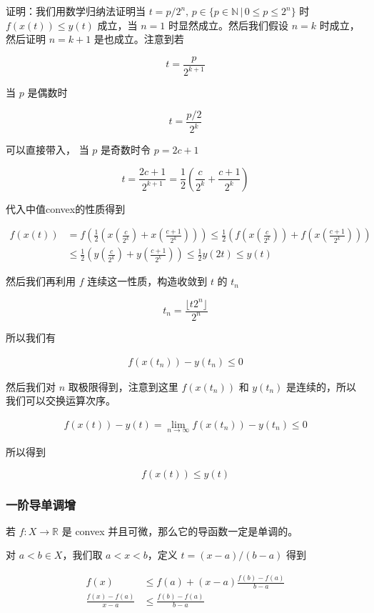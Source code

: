 \documentclass[12pt,a4paper]{ctexart}
\begin{document}
证明：我们用数学归纳法证明当 $t = p/2^n,\, p \in \{ p \in \mathbb{N} \,\vert \, 0 \le p \le 2^n \}$ 时 $f(x(t)) \le y(t)$ 成立，当 $n=1$ 时显然成立。然后我们假设 $n=k$ 时成立，然后证明
$n=k+1$ 是也成立。注意到若

\[
t = \frac{p}{2^{k+1}}
\]

当 $p$ 是偶数时

\[
t = \frac{p/2}{2^k}
\]

可以直接带入，
当 $p$ 是奇数时令 $p = 2c+1$

\[
t = \frac{2c+1}{2^{k+1}} = \frac{1}{2}\left(\frac{c}{2^k} + \frac{c+1}{2^k}\right)
\]


代入中值convex的性质得到

\begin{align*}
f(x(t)) &= f(\frac{1}{2}\left(x(\frac{c}{2^k}) + x(\frac{c+1}{2^k})\right)) \le \frac{1}{2}\left( f(x(\frac{c}{2^k})) + f(x(\frac{c+1}{2^k})) \right) \\
& \le \frac{1}{2}\left( y(\frac{c}{2^k})  + y(\frac{c+1}{2^k})\right) \le \frac{1}{2}y(2t) \le y(t)
\end{align*}

然后我们再利用 $f$ 连续这一性质，构造收敛到 $t$ 的 $t_n$

\[
t_n = \frac{\lfloor t 2^n \rfloor}{2^n}
\]

所以我们有

\begin{align*}
f(x(t_n)) - y(t_n) \le 0
\end{align*}

然后我们对 $n$ 取极限得到，注意到这里 $f(x(t_n))$ 和 $y(t_n)$ 是连续的，所以我们可以交换运算次序。

\begin{align*}
f(x(t)) - y(t)= \lim_{n \to \infty}f(x(t_n)) - y(t_n) \le 0
\end{align*}

所以得到

\[
f(x(t)) \le y(t)
\]

\subsubsection{一阶导单调增}

若 $f: X \to \mathbb{R}$ 是 convex 并且可微，那么它的导函数一定是单调的。

对 $a < b \in X$，我们取 $a < x < b$，定义 $t = (x-a)/(b-a)$ 得到

\begin{align*}
    f(x) &\le f(a) + (x-a)\frac{f(b) - f(a)}{b-a} \\
    \frac{f(x) - f(a)}{x-a} & \le \frac{f(b) - f(a)}{b-a}
\end{align*}
\end{document}
